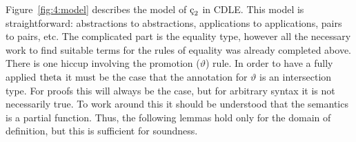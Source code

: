 Figure~\ref{fig:4:model} describes the model of $\ced$ in CDLE.
This model is straightforward: abstractions to abstractions, applications to applications, pairs to pairs, etc.
The complicated part is the equality type, however all the necessary work to find suitable terms for the rules of equality was already completed above.
There is one hiccup involving the promotion ($\vartheta$) rule.
In order to have a fully applied $\textnormal{theta}$ it must be the case that the annotation for $\vartheta$ is an intersection type.
For proofs this will always be the case, but for arbitrary syntax it is not necessarily true.
To work around this it should be understood that the semantics is a partial function.
Thus, the following lemmas hold only for the domain of definition, but this is sufficient for soundness.



